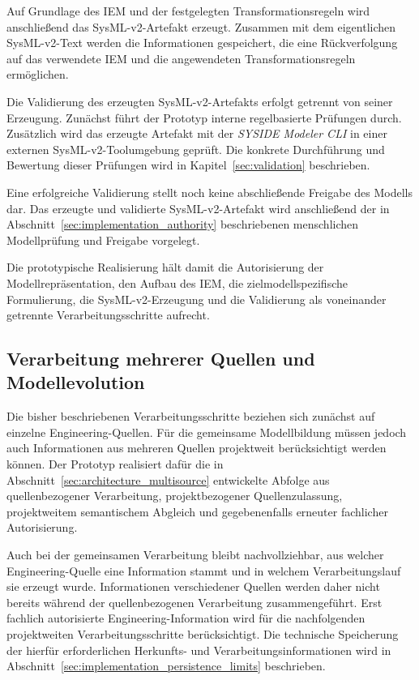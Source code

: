 Auf Grundlage des IEM und der festgelegten Transformationsregeln wird
anschließend das SysML-v2-Artefakt erzeugt. Zusammen mit dem eigentlichen
SysML-v2-Text werden die Informationen gespeichert, die eine
Rückverfolgung auf das verwendete IEM und die angewendeten
Transformationsregeln ermöglichen.

Die Validierung des erzeugten SysML-v2-Artefakts erfolgt getrennt von seiner
Erzeugung. Zunächst führt der Prototyp interne regelbasierte Prüfungen durch.
Zusätzlich wird das erzeugte Artefakt mit der \emph{SYSIDE Modeler CLI} in
einer externen SysML-v2-Toolumgebung geprüft. Die konkrete Durchführung und
Bewertung dieser Prüfungen wird in
Kapitel~\ref{sec:validation} beschrieben.

Eine erfolgreiche Validierung stellt noch keine abschließende Freigabe des
Modells dar. Das erzeugte und validierte SysML-v2-Artefakt wird anschließend
der in Abschnitt~\ref{sec:implementation_authority} beschriebenen
menschlichen Modellprüfung und Freigabe vorgelegt.

Die prototypische Realisierung hält damit die Autorisierung der
Modellrepräsentation, den Aufbau des IEM, die zielmodellspezifische
Formulierung, die SysML-v2-Erzeugung und die Validierung als voneinander
getrennte Verarbeitungsschritte aufrecht.

\subsection{Verarbeitung mehrerer Quellen und Modellevolution}
\label{sec:implementation_multisource}

Die bisher beschriebenen Verarbeitungsschritte beziehen sich zunächst auf
einzelne Engineering-Quellen. Für die gemeinsame Modellbildung müssen jedoch
auch Informationen aus mehreren Quellen projektweit berücksichtigt werden
können. Der Prototyp realisiert dafür die in
Abschnitt~\ref{sec:architecture_multisource} entwickelte Abfolge aus
quellenbezogener Verarbeitung, projektbezogener Quellenzulassung,
projektweitem semantischem Abgleich und gegebenenfalls erneuter fachlicher
Autorisierung.

Auch bei der gemeinsamen Verarbeitung bleibt nachvollziehbar, aus welcher
Engineering-Quelle eine Information stammt und in welchem Verarbeitungslauf
sie erzeugt wurde. Informationen verschiedener Quellen werden daher nicht
bereits während der quellenbezogenen Verarbeitung zusammengeführt. Erst
fachlich autorisierte Engineering-Information wird für die nachfolgenden
projektweiten Verarbeitungsschritte berücksichtigt. Die technische
Speicherung der hierfür erforderlichen Herkunfts- und
Verarbeitungsinformationen wird in
Abschnitt~\ref{sec:implementation_persistence_limits} beschrieben.

